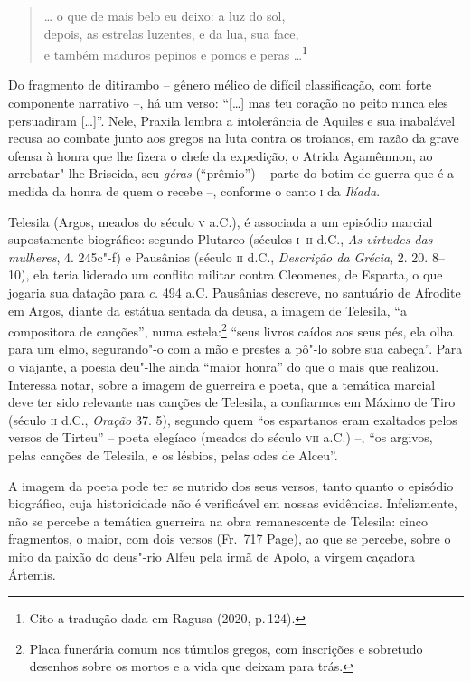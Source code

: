 \begin{quote}
\ldots{} o que de mais belo eu deixo: a luz do sol,\\
 depois, as estrelas luzentes, e da lua, sua face,\\
e também maduros pepinos e pomos e peras \ldots{}\footnote{Cito a tradução dada em Ragusa (2020, p.\,124).}
\end{quote}

Do fragmento de ditirambo -- gênero mélico de difícil classificação, com forte
componente narrativo --, há um verso: ``[\ldots{}] mas teu coração no peito nunca
eles persuadiram [\ldots{}]”. Nele, Praxila lembra a intolerância de Aquiles e sua
inabalável recusa ao combate junto aos gregos na luta contra os troianos, em razão da
grave ofensa à honra que lhe fizera o chefe da expedição, o Atrida
Agamêmnon, ao arrebatar"-lhe Briseida, seu \textit{géras} (“prêmio”) -- parte do
botim de guerra que é a medida da honra de quem o recebe --, conforme o canto \textsc{i}
da \textit{Ilíada}.

Telesila (Argos, meados do século \textsc{v} a.C.), é associada a um episódio marcial
supostamente biográfico: segundo Plutarco (séculos \textsc{i}--\textsc{ii} d.C., \textit{As
virtudes das mulheres}, 4. 245c"-f) e Pausânias (século \textsc{ii} d.C.,
\textit{Descrição da Grécia}, 2. 20. 8--10), ela teria liderado um conflito
militar contra Cleomenes, de Esparta, o que jogaria sua datação para \textit{c.}
494 a.C. Pausânias descreve, no santuário de Afrodite em Argos, diante da
estátua sentada da deusa, a imagem de Telesila, ``a compositora de
canções”, numa estela:\footnote{ Placa funerária comum nos túmulos gregos, com
inscrições e sobretudo desenhos sobre os mortos e a vida que deixam para trás.} ``seus livros caídos aos seus
pés, ela olha para um elmo, segurando"-o com a mão e prestes a pô"-lo sobre sua
cabeça”. Para o viajante, a poesia deu"-lhe ainda ``maior honra” do
que o mais que realizou. Interessa notar, sobre a imagem de guerreira e poeta,
que a temática marcial deve ter sido relevante nas canções de Telesila, a
confiarmos em Máximo de Tiro (século \textsc{ii} d.C., \textit{Oração} 37. 5), segundo
quem ``os espartanos eram exaltados pelos versos de Tirteu” -- 
poeta elegíaco (meados do século \textsc{vii} a.C.) --, ``os argivos, pelas
canções de Telesila, e os lésbios, pelas odes de Alceu”. 

A imagem da poeta pode ter se nutrido dos
seus versos, tanto quanto o episódio biográfico, cuja historicidade não
é verificável em nossas evidências.
Infelizmente, não se percebe a temática guerreira na obra
remanescente de Telesila: cinco fragmentos, o maior, com dois versos (Fr.~717 Page),
ao que se percebe, sobre o mito da paixão do deus"-rio Alfeu pela irmã de Apolo,
a virgem caçadora Ártemis.

